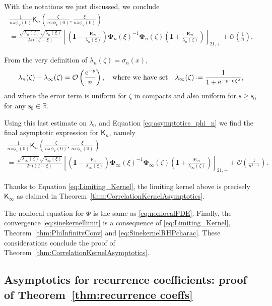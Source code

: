 \documentclass[reqno,a4paper,11pt]{amsart}
\DeclareMathOperator{\ee}{\rm e}
\newcommand{\R}{\mathbb{R}}
\newcommand{\Boh}{\mathcal{O}}
\newcommand{\ii}{\mathrm{i}}
\renewcommand{\bm}{\mathbf}
\newcommand{\msf}{\mathsf}
\newcommand{\sad}{\msf s}
\newcommand{\uad}{\msf u}
\theoremstyle{definition}
\theoremstyle{remark}
\numberwithin{equation}{section}
\newcommand*{\defeq}{\mathrel{\vcenter{\baselineskip0.5ex \lineskiplimit0pt
                     \hbox{\scriptsize.}\hbox{\scriptsize.}}}%
                     =}
\begin{document}
With the notations we just discussed, we conclude
%
\begin{multline*}
\frac{1}{n\pi \phi_V(0)} \msf K_n\left( \frac{\zeta}{n \pi \phi_V(0)},\frac{\xi}{ n\pi \phi_V(0)} \right)\\ 
    = \frac{\sqrt{{\lambda}_n(\zeta)}\sqrt{{\lambda}_n(\xi)}}{2 \pi \ii (\zeta - \xi)} 
    \left[ \left( \bm I-\frac{\bm E_{21}}{{\lambda}_n(\xi)} \right) \bm \Phi_n(\xi)^{-1} \bm \Phi_n(\zeta) \left( \bm I+\frac{\bm E_{21}}{{\lambda}_n(\zeta)}\right)\right]_{21,+} + \Boh \left( \frac{1}{n}\right).
\end{multline*}

From the very definition of ${\lambda}_n(\zeta)=\sigma_n(x)$,
%
$$
    {\lambda}_n(\zeta) - \lambda_\infty(\zeta) = \Boh\left(\frac{\ee^{-\sad}}{n}\right),\quad \text{where we have set}\quad \lambda_\infty(\zeta) \defeq \frac{1}{1 + \ee^{- \sad -  \uad \zeta^2}},
$$
%
and where the error term is uniform for $\zeta$ in compacts and also uniform for $\sad\geq \sad_0$ for any $\sad_0\in \R$. 

Using this last estimate on $\lambda_n$ and Equation \eqref{eq:asymptotics_phi_n} we find the final asymptotic expression for $\msf K_n$, namely
%
\begin{multline*}
\frac{1}{n\pi \phi_V(0)} \msf K_n\left( \frac{\zeta}{n \pi \phi_V(0)},\frac{\xi}{ n\pi \phi_V(0)} \right)\\ 
        = \frac{\sqrt{\lambda_\infty(\zeta)}\sqrt{\lambda_\infty(\xi)}}{2 \pi \ii (\zeta - \xi)} 
    \left[ \left( \bm I-\frac{\bm E_{21}}{\lambda_\infty(\xi)} \right) \bm \Phi_\infty(\xi)^{-1} \bm \Phi_\infty(\zeta) \left( \bm I+\frac{\bm E_{21}}{\lambda_\infty(\zeta)}\right)\right]_{21,+} 
 + \Boh \left( \frac{1}{n^{1-\varepsilon}}\right).
\end{multline*}
%

Thanks to Equation \eqref{eq:Limiting_Kernel}, the limiting kernel above is precisely $\msf K_\infty$ as claimed in Theorem~\ref{thm:CorrelationKernelAsymptotics}. 

The nonlocal equation for $\msf \Phi$ is the same as \eqref{eq:nonlocalPDE}. Finally, the convergence \eqref{eq:sinekernellimit} is a consequence of \eqref{eq:Limiting_Kernel}, Theorem~\ref{thm:PhiInfinityConv} and \eqref{eq:SinekernelRHPcharac}. These considerations conclude the proof of Theorem~\ref{thm:CorrelationKernelAsymptotics}.

\subsection{Asymptotics for recurrence coefficients: proof of Theorem~\ref{thm:recurrence coeffs}}\hfill 
\end{document}
